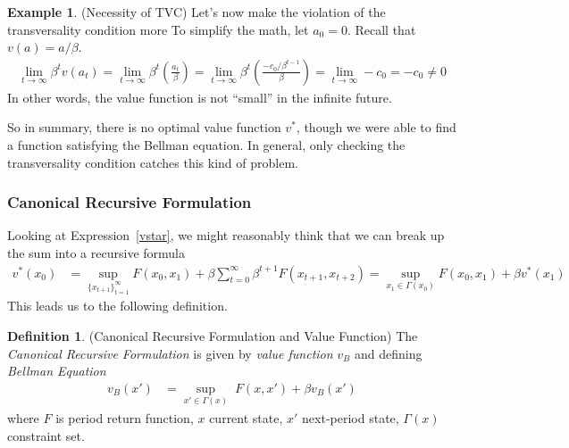 \documentclass[12pt]{article}
\numberwithin{equation}{section} %
\theoremstyle{plain}
\theoremstyle{definition}
\newtheorem{defn}[thm]{Definition}
\newtheorem{ex}[thm]{Example}
\theoremstyle{remark}
\begin{document}
\begin{ex}{(Necessity of TVC)}
Let's now make the violation of the transversality condition more
To simplify the math, let $a_0=0$. Recall that $v(a) = a/\beta$.
\begin{align*}
  \lim_{t\rightarrow\infty} \beta^t v(a_t)
  = \lim_{t\rightarrow\infty} \beta^t \left(\frac{a_t}{\beta}\right)
  = \lim_{t\rightarrow\infty} \beta^t
  \left(
  \frac{-c_0/\beta^{t-1}}{\beta}
  \right)
  = \lim_{t\rightarrow\infty}
  -c_0
  = -c_0 \neq 0
\end{align*}
In other words, the value function is not ``small'' in the infinite
future.

So in summary, there is no optimal value function $v^*$, though we were
able to find a function satisfying the Bellman equation. In general,
only checking the transversality condition catches this kind of problem.
\end{ex}


\clearpage
\subsubsection{Canonical Recursive Formulation}

Looking at Expression~\ref{vstar}, we might reasonably think that we can
break up the sum into a recursive formula
\begin{align*}
  v^*(x_0)
  &=
  \sup_{\{x_{t+1}\}^\infty_{t=1}}
  F(x_0,x_1) +
  \beta \sum^\infty_{t=0} \beta^{t+1} F(x_{t+1},x_{t+2})
  =
  \sup_{x_1\in\Gamma(x_0)}
  F(x_0,x_1) +
  \beta v^*(x_1)
\end{align*}
This leads us to the following definition.

\begin{defn}{(Canonical Recursive Formulation and Value Function)}
\label{defn:bellman}
The \emph{Canonical Recursive Formulation} is given by
\emph{value function} $v_B$ and defining \emph{Bellman Equation}
\begin{align}
  \label{eq:vB}
  v_B(x') &=
  \sup_{x'\in\Gamma(x)}\;
  F(x,x') +
  \beta v_B(x')
\end{align}
where $F$ is period return function, $x$ current state,
$x'$ next-period state, $\Gamma(x)$ constraint set.
\end{defn}
\end{document}
